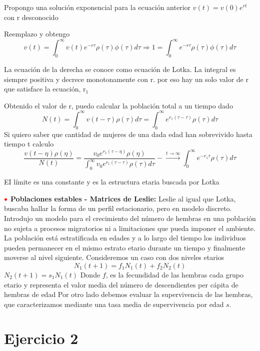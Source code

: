\documentclass[%
 reprint,
 amsmath,amssymb,
 aps,
]{revtex4-1}
\newcommand{\tema}{\color{red}{\bullet}}
\begin{document}
Propongo una solución exponencial para la ecuación anterior $v(t)=v(0) e^{r t}$
con $\mathrm{r}$ desconocido

Reemplazo y obtengo
$$
v(t)=\int_{0}^{\infty} v(t) e^{-r \tau} \rho(\tau) \phi(\tau) d \tau \Rightarrow 1=\int_{0}^{\infty} e^{-r \tau} \rho(\tau) \phi(\tau) d \tau
$$

La ecuación de la derecha se conoce como ecuación de Lotka. La integral es siempre positiva y decrece monotonamente con $\mathrm{r}$. por eso hay un solo valor de $\mathrm{r}$ que satisface la ecuación, $\mathrm{r}_{1}$

Obtenido el valor de r, puedo calcular la población total a un tiempo dado
$$
N(t)=\int_{0}^{\infty} v(t-\tau) \rho(\tau) d \tau=\int_{0}^{\infty} e^{r_{1}(\tau-\tau)} \rho(\tau) d \tau
$$
Si quiero saber que cantidad de mujeres de una dada edad han sobrevivido hasta tiempo t calculo
$$
\frac{v(t-\eta) \rho(\eta)}{N(t)}=\frac{v_{0} e^{r_{1}(\tau-\eta)} \rho(\eta)}{\int_{0}^{\infty} v_{0} e^{r_{1}(\tau-\tau)} \rho(\tau) d \tau}-\stackrel{t \rightarrow \infty}{\rightarrow} \int_{0}^{\infty} e^{-r_{1} \tau} \rho(\tau) d \tau
$$

EI límite es una constante y es la estructura etaria buscada por Lotka

$\tema$ \textbf{Poblaciones estables - Matrices de Leslie:}
Leslie al igual que Lotka, buscaba hallar la forma de un perfil estacionario, pero en modelo discreto. Introdujo un modelo para el crecimiento del número de hembras en una población no sujeta a procesos migratorios ni a limitaciones que pueda imponer el ambiente. La población está estratificada en edades y a lo largo del tiempo los individuos pueden permanecer en el mismo estrato etario durante un tiempo y finalmente moverse al nivel siguiente. Consideremos un caso con dos niveles etarios
$$
N_{1}(t+1)=f_{1} N_{1}(t)+f_{2} N_{2}(t)
$$
$N_{2}(t+1)=s_{1} N_{1}(t)$
Donde $f$, es la fecundidad de las hembras cada grupo etario y representa el valor media del número de descendientes per cápita de hembras de edad Por otro lado debemos evaluar la supervivencia de las hembras, que caracterizamos mediante una tasa media de supervivencia por edad $s$.

\section{Ejercicio 2}
\end{document}
